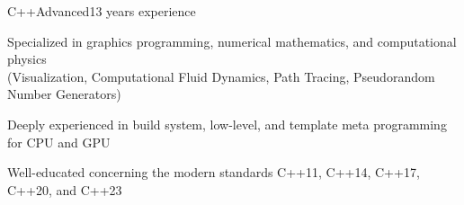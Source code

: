 \documentclass[a4paper,10pt]{cv}
\begin{document}
        \begin{cvLongSkillItem}{C++}{Advanced}{13 years experience}%
          \vspace{-15pt}
          \begin{cvItemize}
            \item Specialized in graphics programming, numerical mathematics, and computational physics \\
            (Visualization, Computational Fluid Dynamics, Path Tracing, Pseudorandom Number Generators)
            \item Deeply experienced in build system, low-level, and template meta programming for CPU and GPU
            \item Well-educated concerning the modern standards C++11, C++14, C++17, C++20, and C++23
          \end{cvItemize}

\end{cvLongSkillItem}
\end{document}
